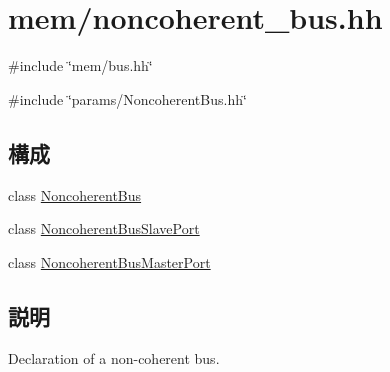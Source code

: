 \hypertarget{noncoherent__bus_8hh}{
\section{mem/noncoherent\_\-bus.hh}
\label{noncoherent__bus_8hh}
}
{\ttfamily \#include \char`\"{}mem/bus.hh\char`\"{}}\par
{\ttfamily \#include \char`\"{}params/NoncoherentBus.hh\char`\"{}}\par
\subsection*{構成}
\begin{DoxyCompactItemize}
\item 
class \hyperlink{classNoncoherentBus}{NoncoherentBus}
\item 
class \hyperlink{classNoncoherentBus_1_1NoncoherentBusSlavePort}{NoncoherentBusSlavePort}
\item 
class \hyperlink{classNoncoherentBus_1_1NoncoherentBusMasterPort}{NoncoherentBusMasterPort}
\end{DoxyCompactItemize}


\subsection{説明}
Declaration of a non-\/coherent bus. 
